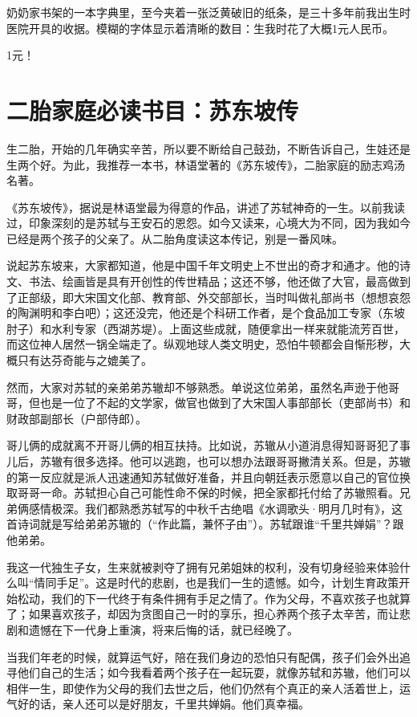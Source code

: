 \documentclass[twoside,openright,headings=optiontohead]{ctexbook} %
\begin{document}
{奶奶家书架的一本字典里，至今夹着一张泛黄破旧的纸条，是三十多年前我出生时医院开具的收据。模糊的字体显示着清晰的数目：生我时花了大概1元人民币。

1元！

\chapter*{二胎家庭必读书目：苏东坡传}\label{gay-genius}

生二胎，开始的几年确实辛苦，所以要不断给自己鼓劲，不断告诉自己，生娃还是生两个好。为此，我推荐一本书，林语堂著的《苏东坡传》，二胎家庭的励志鸡汤名著。

《苏东坡传》，据说是林语堂最为得意的作品，讲述了苏轼神奇的一生。以前我读过，印象深刻的是苏轼与王安石的恩怨。如今又读来，心境大为不同，因为我如今已经是两个孩子的父亲了。从二胎角度读这本传记，别是一番风味。

说起苏东坡来，大家都知道，他是中国千年文明史上不世出的奇才和通才。他的诗文、书法、绘画皆是具有开创性的传世精品；这还不够，他还做了大官，最高做到了正部级，即大宋国文化部、教育部、外交部部长，当时叫做礼部尚书（想想哀怨的陶渊明和李白吧）；这还没完，他还是个科研工作者，是个食品加工专家（东坡肘子）和水利专家（西湖苏堤）。上面这些成就，随便拿出一样来就能流芳百世，而这位神人居然一锅全端走了。纵观地球人类文明史，恐怕牛顿都会自惭形秽，大概只有达芬奇能与之媲美了。

然而，大家对苏轼的亲弟弟苏辙却不够熟悉。单说这位弟弟，虽然名声逊于他哥哥，但也是一位了不起的文学家，做官也做到了大宋国人事部部长（吏部尚书）和财政部副部长（户部侍郎）。

哥儿俩的成就离不开哥儿俩的相互扶持。比如说，苏辙从小道消息得知哥哥犯了事儿后，苏辙有很多选择。他可以逃跑，也可以想办法跟哥哥撇清关系。但是，苏辙的第一反应就是派人迅速通知苏轼做好准备，并且向朝廷表示愿意以自己的官位换取哥哥一命。苏轼担心自己可能性命不保的时候，把全家都托付给了苏辙照看。兄弟俩感情极深。我们都熟悉苏轼写的中秋千古绝唱《水调歌头·明月几时有》，这首诗词就是写给弟弟苏辙的（``作此篇，兼怀子由''）。苏轼跟谁``千里共婵娟''？跟他弟弟。

我这一代独生子女，生来就被剥夺了拥有兄弟姐妹的权利，没有切身经验来体验什么叫``情同手足''。这是时代的悲剧，也是我们一生的遗憾。如今，计划生育政策开始松动，我们的下一代终于有条件拥有手足之情了。作为父母，不喜欢孩子也就算了；如果喜欢孩子，却因为贪图自己一时的享乐，担心养两个孩子太辛苦，而让悲剧和遗憾在下一代身上重演，将来后悔的话，就已经晚了。

当我们年老的时候，就算运气好，陪在我们身边的恐怕只有配偶，孩子们会外出追寻他们自己的生活；如今我看着两个孩子在一起玩耍，就像苏轼和苏辙，他们可以相伴一生，即使作为父母的我们去世之后，他们仍然有个真正的亲人活着世上，运气好的话，亲人还可以是好朋友，千里共婵娟。他们真幸福。

}
\end{document}
